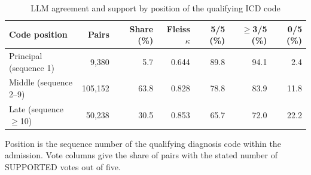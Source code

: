 \documentclass[unnumsec,webpdf,contemporary,large]{oup-authoring-template}
\begin{document}
\begin{table}[H]
\caption{LLM agreement and support by position of the qualifying ICD code}
\label{tab:s_llm_icd}
\centering
\small
\begin{tabular}{lrrrrrr}
\toprule
Code position & Pairs & Share (\%) & Fleiss \(\kappa\) & 5/5 (\%) & \(\geq\)3/5 (\%) & 0/5 (\%) \\
\midrule
Principal (sequence 1) & 9,380 & 5.7 & 0.644 & 89.8 & 94.1 & 2.4 \\
Middle (sequence 2--9) & 105,152 & 63.8 & 0.828 & 78.8 & 83.9 & 11.8 \\
Late (sequence \(\geq\)10) & 50,238 & 30.5 & 0.853 & 65.7 & 72.0 & 22.2 \\
\bottomrule
\end{tabular}
\begin{tablenotes}
\item Position is the sequence number of the qualifying diagnosis code within the admission. Vote columns give the share of pairs with the stated number of SUPPORTED votes out of five.
\end{tablenotes}
\end{table}
\end{document}
